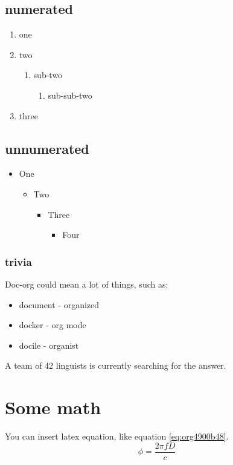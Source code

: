 \subsection{numerated}
\label{sec:org2c536e7}
\begin{enumerate}
\item one
\item two
\begin{enumerate}
\item sub-two
\begin{enumerate}
\item sub-sub-two
\end{enumerate}
\end{enumerate}
\item three
\end{enumerate}

\subsection{unnumerated}
\label{sec:org022e56f}
\begin{itemize}
\item One
\begin{itemize}
\item Two
\begin{itemize}
\item Three
\begin{itemize}
\item Four
\end{itemize}
\end{itemize}
\end{itemize}
\end{itemize}

\subsubsection{trivia}
\label{sec:orgb8f494e}
Doc-org could mean a lot of things, such as:
\begin{itemize}
\item document - organized
\item docker - org mode
\item docile - organist
\end{itemize}
A team of 42 linguists is currently searching for the answer.

\section{Some math}
\label{sec:orgea2bc47}
You can insert latex equation, like equation \ref{eq:org4900b48}.
\begin{equation}
\label{eq:org4900b48}
\phi = \frac{2\pi fD}{c}
\end{equation}


